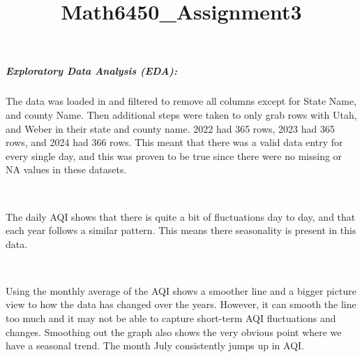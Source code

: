 \documentclass[11pt, twocolumn]{article}
\title{Math6450\_Assignment3}
\begin{document}
    
    \maketitle
    
    

    
    \subparagraph{Exploratory Data Analysis
(EDA):}\label{exploratory-data-analysis-eda}

    The data was loaded in and filtered to remove all columns except for
State Name, and county Name. Then additional steps were taken to only
grab rows with Utah, and Weber in their state and county name. 2022 had
365 rows, 2023 had 365 rows, and 2024 had 366 rows. This meant that
there was a valid data entry for every single day, and this was proven
to be true since there were no missing or NA values in these datasets.

    \begin{center}
    \end{center}
    { \hspace*{\fill} \\}
    
    The daily AQI shows that there is quite a bit of fluctuations day to
day, and that each year follows a similar pattern. This means there
seasonality is present in this data.

    \begin{center}
    \end{center}
    { \hspace*{\fill} \\}
    
    Using the monthly average of the AQI shows a smoother line and a bigger
picture view to how the data has changed over the years. However, it can
smooth the line too much and it may not be able to capture short-term
AQI fluctuations and changes. Smoothing out the graph also shows the
very obvious point where we have a seasonal trend. The month July
consistently jumps up in AQI.

    \begin{center}
    \end{center}
    { \hspace*{\fill} \\}
    
\end{document}
